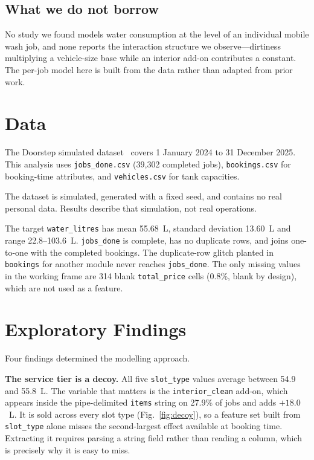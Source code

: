 \documentclass[conference]{IEEEtran}
\begin{document}
\subsection{What we do not borrow}
No study we found models water consumption at the level of an individual mobile wash job, and
none reports the interaction structure we observe---dirtiness multiplying a vehicle-size base
while an interior add-on contributes a constant. The per-job model here is built from the data
rather than adapted from prior work.

\section{Data}

The Doorstep simulated dataset~\cite{doorstep2026dataset} covers 1 January 2024 to 31 December
2025. This analysis uses \texttt{jobs\_done.csv} (39,302 completed jobs), \texttt{bookings.csv}
for booking-time attributes, and \texttt{vehicles.csv} for tank capacities.

The dataset is simulated, generated with a fixed seed, and contains no real personal data.
Results describe that simulation, not real operations.

The target \texttt{water\_litres} has mean 55.68~L, standard deviation 13.60~L and range
22.8--103.6~L. \texttt{jobs\_done} is complete, has no duplicate rows, and joins one-to-one
with the completed bookings. The duplicate-row glitch planted in \texttt{bookings} for another
module never reaches \texttt{jobs\_done}. The only missing values in the working frame are 314
blank \texttt{total\_price} cells (0.8\%, blank by design), which are not used as a feature.

\section{Exploratory Findings}

Four findings determined the modelling approach.

\textbf{The service tier is a decoy.} All five \texttt{slot\_type} values average between 54.9
and 55.8~L. The variable that matters is the \texttt{interior\_clean} add-on, which appears
inside the pipe-delimited \texttt{items} string on 27.9\% of jobs and adds $+18.0$~L. It is
sold across every slot type (Fig.~\ref{fig:decoy}), so a feature set built from \texttt{slot\_type} alone misses the
second-largest effect available at booking time. Extracting it requires parsing a string field
rather than reading a column, which is precisely why it is easy to miss.
\end{document}
